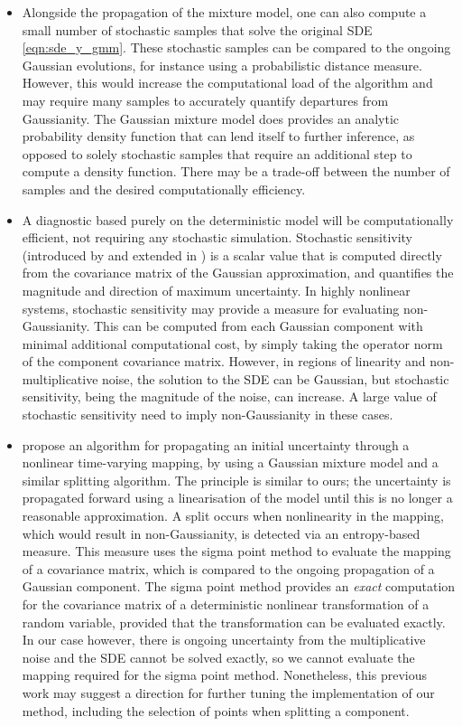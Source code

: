 \begin{itemize}
	\item Alongside the propagation of the mixture model, one can also compute a small number of stochastic samples that solve the original SDE \cref{eqn:sde_y_gmm}.
		These stochastic samples can be compared to the ongoing Gaussian evolutions, for instance using a probabilistic distance measure.
		However, this would increase the computational load of the algorithm and may require many samples to accurately quantify departures from Gaussianity.
	 The Gaussian mixture model does provides an analytic probability density function that can lend itself to further inference, as opposed to solely stochastic samples that require an additional step to compute a density function.
	 There may be a trade-off between the number of samples and the desired computationally efficiency.

	\item A diagnostic based purely on the deterministic model will be computationally efficient, not requiring any stochastic simulation.
		Stochastic sensitivity (introduced by \citet{Balasuriya_2020_StochasticSensitivityComputable} and extended in ) is a scalar value that is computed directly from the covariance matrix of the Gaussian approximation, and quantifies the magnitude and direction of maximum uncertainty.
		In highly nonlinear systems, stochastic sensitivity may provide a measure for evaluating non-Gaussianity.
		This can be computed from each Gaussian component with minimal additional computational cost, by simply taking the operator norm of the component covariance matrix.
		However, in regions of linearity and non-multiplicative noise, the solution to the SDE can be Gaussian, but stochastic sensitivity, being the magnitude of the noise, can increase.
		A large value of stochastic sensitivity need to imply non-Gaussianity in these cases.


	\item \citet{DeMarsEtAl_2013_EntropyBasedApproachUncertainty} propose an algorithm for propagating an initial uncertainty through a nonlinear time-varying mapping, by using a Gaussian mixture model and a similar splitting algorithm.
The principle is similar to ours; the uncertainty is propagated forward using a linearisation of the model until this is no longer a reasonable approximation.
A split occurs when nonlinearity in the mapping, which would result in non-Gaussianity, is detected via an entropy-based measure.
This measure uses the sigma point method to evaluate the mapping of a covariance matrix, which is compared to the ongoing propagation of a Gaussian component.
The sigma point method provides an \emph{exact} computation for the covariance matrix of a deterministic nonlinear transformation of a random variable, provided that the transformation can be evaluated exactly.
In our case however, there is ongoing uncertainty from the multiplicative noise and the SDE cannot be solved exactly, so we cannot evaluate the mapping required for the sigma point method.
Nonetheless, this previous work may suggest a direction for further tuning the implementation of our method, including the selection of points when splitting a component.

\end{itemize}
